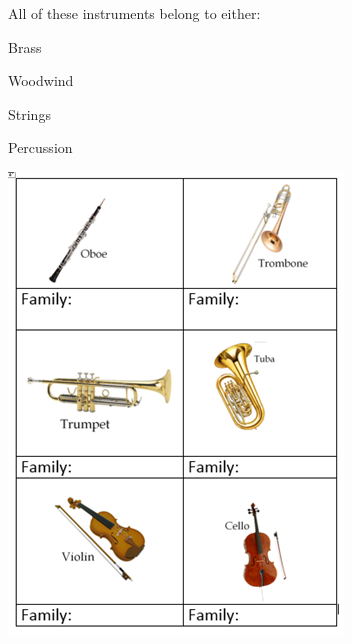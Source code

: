 \documentclass{article}
\begin{document}
\noindent
All of these instruments belong to either:
\vspace{1em}
\par \noindent Brass
\par \noindent Woodwind
\par \noindent Strings
\par \noindent Percussion

\vspace{1em}



\vspace{2em}

\begin{minipage}[t]{0.48\textwidth}
    \includegraphics[width=\linewidth]{fam1.png}
\end{minipage}
\hfill
\end{document}
